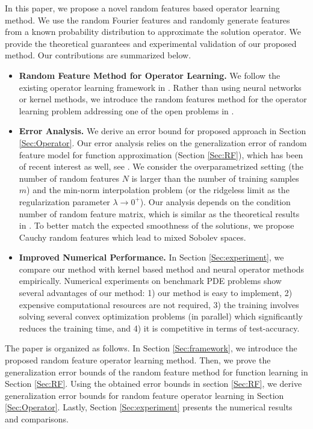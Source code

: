 \documentclass[11pt,twoside]{article}
\theoremstyle{plain}
\theoremstyle{definition}
\theoremstyle{remark}
\begin{document}
In this paper, we propose a novel random features based operator learning method.
We use the random Fourier features \cite{Rahimi2007RFM} and randomly generate features from a known probability distribution to approximate the solution operator.
We provide the theoretical guarantees and experimental validation of our proposed method. 
Our contributions are summarized below.
\begin{itemize}
\item {\bf Random Feature Method for Operator Learning.}  We follow the existing operator learning framework in \cite{MHASKAR2023local, BATLLE2024kernel, Liu2025generalization}. Rather than using neural networks or kernel methods, we introduce the random features method for the operator learning problem addressing one of the open problems in \cite{BATLLE2024kernel}.
\item {\bf Error Analysis.} We derive an error bound for proposed approach in Section \ref{Sec:Operator}. Our error analysis relies on the generalization error of random feature model for function approximation (Section \ref{Sec:RF}), which has been of recent interest as well, see \cite{Li2018TowardsAU, richardson2024srmd, HASHEMI2023generalization, chen2024conditioning, liu2023random, saha2023harfe, xie2022shrimp, chen2022concentration, Rudi2017generalizationRFM, MEI2022RFM,Rahimi2008Uniform}. We consider the overparametrized setting (the number of random features $N$ is larger than the number of training samples $m$) and the min-norm interpolation problem (or the ridgeless limit as the regularization parameter $\lambda\to0^+$). Our analysis depends on the condition number of random feature matrix, which is similar as the theoretical results in \cite{chen2024conditioning}. To better match the expected smoothness of the solutions, we propose Cauchy random features which lead to mixed Sobolev spaces.
\item {\bf Improved Numerical Performance.} In Section \ref{Sec:experiment}, we compare our method with kernel based method and neural operator methods empirically. Numerical experiments on benchmark PDE problems show several advantages of our method: 1) our method is easy to implement, 2) expensive computational resources are not required, 3) the training involves solving several convex optimization problems (in parallel) which significantly reduces the training time, and 4) it is competitive in terms of test-accuracy. 
\end{itemize}
The paper is organized as follows. In Section \ref{Sec:framework}, we introduce the proposed random feature operator learning method. Then, we prove the generalization error bounds of the random feature method for function learning in Section \ref{Sec:RF}. Using the obtained error bounds in section \ref{Sec:RF}, we derive generalization error bounds for random feature operator learning in Section \ref{Sec:Operator}. Lastly, Section \ref{Sec:experiment} presents the numerical results and comparisons.
\end{document}
